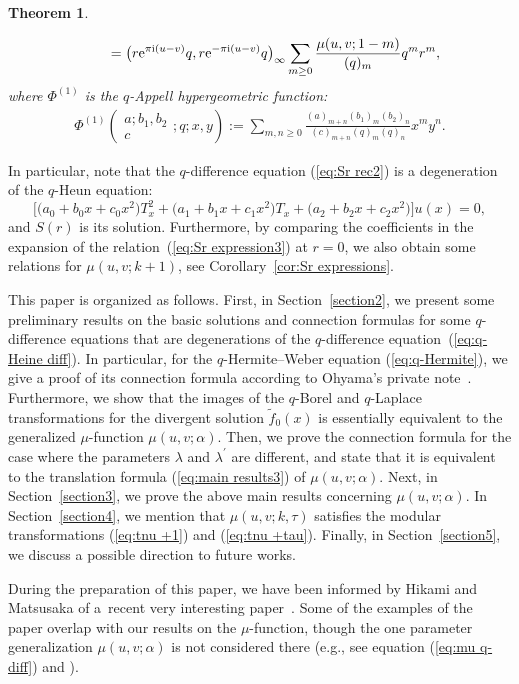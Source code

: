 \documentclass[pdftex]{sigma}
\numberwithin{equation}{section}
\newtheorem{thm}{Theorem}[section]
\theoremstyle{definition}
\begin{document}
\begin{thm}
\begin{enumerate}
\begin{gather}
\label{eq:Sr expression3}
\hphantom{S(r)}{}
 =
 \big(r{\rm e}^{\pi{\rm i}(u-v)}q,r{\rm e}^{-\pi{\rm i}(u-v)}q\big)_{\infty }
 \sum_{m\geq 0}\frac{\mu(u,v;1-m )}{(q)_{m}}q^{m}r^{m},
\end{gather}
where $\Phi^{(1)}$ is the $q$-Appell hypergeometric function:
\begin{gather}
\label{q-Appell}
\Phi^{(1)}\left(\begin{matrix}a;b_{1},b_{2} \\ c \end{matrix};q;x, y\right)
 :=
 \sum_{m,n\geq0}
 \frac{(a)_{m+n}(b_1)_m(b_2)_n}{(c)_{m+n}(q)_m(q)_n}x^{m}y^{n}.
\end{gather}
\end{enumerate}
\end{thm}
In particular, note that the $q$-difference equation (\ref{eq:Sr rec2}) is a degeneration of the $q$-Heun equation:
\[
\big[\big(a_{0}+b_{0}x+c_{0}x^{2}\big)T_{x}^{2}+\big(a_{1}+b_{1}x+c_{1}x^{2}\big)T_{x}+\big(a_{2}+b_{2}x+c_{2}x^{2}\big)\big]u(x)=0,
\]
and $S(r)$ is its solution.
Furthermore, by comparing the coefficients in the expansion of the relation~(\ref{eq:Sr expression3}) at $r=0$, we also obtain some relations for $\mu(u,v;k+1)$, see Corollary~\ref{cor:Sr expressions}.

This paper is organized as follows.
First, in Section~\ref{section2}, we present some preliminary results on the basic solutions and connection formulas for some $q$-difference equations that are degenerations of the $q$-difference equation~(\ref{eq:q-Heine diff}). In particular, for the $q$-Hermite--Weber equation (\ref{eq:q-Hermite}), we give a proof of its connection formula according to Ohyama's private note~\cite{O2}.
Furthermore, we show that the images of the $q$-Borel and $q$-Laplace transformations for the divergent solution $\widetilde{f}_{0}(x)$ is essentially equivalent to the generalized $\mu$-function $\mu(u,v;\alpha)$.
Then, we prove the connection formula for the case where the parameters $\lambda $ and $\lambda^{\prime}$ are different, and state that it is equivalent to the translation formula (\ref{eq:main results3}) of $\mu(u,v;\alpha)$.
Next, in Section~\ref{section3}, we prove the above main results concerning $\mu(u,v;\alpha)$.
In Section~\ref{section4}, we mention that $\mu(u,v;k,\tau)$ satisfies the modular transformations (\ref{eq:tnu +1}) and (\ref{eq:tnu +tau}).
Finally, in Section~\ref{section5}, we discuss a possible direction to future works.

During the preparation of this paper, we have been informed by Hikami and Matsusaka of a~recent very interesting paper~\cite{GW}.
Some of the examples of the paper \cite{GW} overlap with our results on the $\mu$-function, though the one parameter generalization $\mu(u,v;\alpha)$ is not considered there (e.g., see equation (\ref{eq:mu q-diff}) and \cite[Section~4.2]{GW}).
\end{document}
